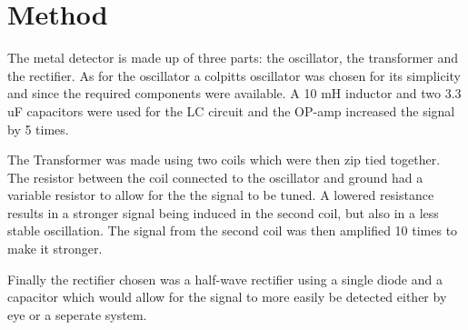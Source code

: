 \section{Method}
% 
The metal detector is made up of three parts: the oscillator, the transformer and the rectifier.
As for the oscillator a colpitts oscillator was chosen for its simplicity and since the required components were available. 
A 10 mH inductor and two 3.3 uF capacitors were used for the LC circuit and the OP-amp increased the signal by 5 times.

The Transformer was made using two coils which were then zip tied together. The resistor between the coil connected to the oscillator 
and ground had a variable resistor to allow for the the signal to be tuned. A lowered resistance results in a stronger signal
 being induced in the second coil, but also in a less stable oscillation. The signal from the second coil was then amplified 10 times to make
 it stronger.

Finally the rectifier chosen was a  half-wave rectifier using a single diode and a capacitor which would allow for the signal to more 
easily be detected either by eye or a seperate system.